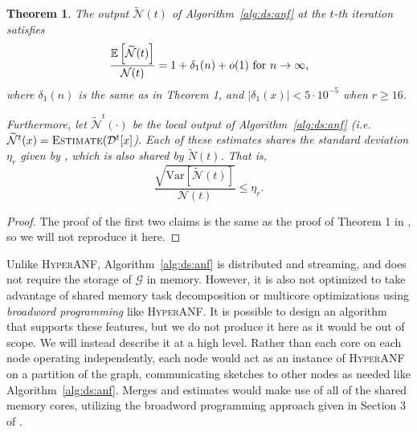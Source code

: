 \documentclass{report}
\newtheorem{theorem}{Theorem}[section]
\newcommand{\algoname}[1]{\textnormal{\textsc{#1}}}
\newcommand{\E}{\mathbb{E}}
\newcommand{\Var}{\mathrm{Var}}
\begin{document}
\begin{theorem}
The output $\widetilde{\mathcal{N}}(t)$ of Algorithm~\ref{alg:ds:anf} at the $t$-th iteration satisfies 
%
\begin{equation*}
	\frac{\E \left [ \widetilde{\mathcal{N}}(t) \right ]}{\mathcal{N}(t)} = 1 + \delta_1(n) + o(1) \textnormal{ for $n \rightarrow \infty$,}
\end{equation*}
%
where $\delta_1(n)$ is the same as in \cite{flajolet2007hyperloglog} Theorem 1, and $|\delta_1(x)| < 5 \cdot 10^{-5}$ when $r \geq 16$.

Furthermore, let $\widetilde{\mathcal{N}}^t(\cdot)$ be the local output of Algorithm~\ref{alg:ds:anf} (i.e. $\widetilde{\mathcal{N}}^t(x) = \algoname{Estimate}(\mathcal{D}^t[x]$).
Each of these estimates shares the standard deviation $\eta_r$ given by \cite{flajolet2007hyperloglog}, which is also shared by $\widetilde{N}(t)$. 
That is, 
%
\begin{equation*}
	\frac{\sqrt{\Var \left [ \widetilde{\mathcal{N}}(t)\right ]}}{\mathcal{N}(t)} \leq \eta_r.
\end{equation*}
%
\end{theorem}

\begin{proof}
The proof of the first two claims is the same as the proof of Theorem 1 in \cite{boldi2011hyperanf}, so we will not reproduce it here.
\end{proof}



Unlike \algoname{HyperANF}, Algorithm~\ref{alg:ds:anf} is distributed and streaming, and does not require the storage of $\mathcal{G}$ in memory. 
However, it is also not optimized to take advantage of shared memory task decomposition or multicore optimizations using \emph{broadword programming} like \algoname{HyperANF}.
It is possible to design an algorithm that supports these features, but we do not produce it here as it would be out of scope. 
We will instead describe it at a high level.
Rather than each core on each node operating independently, each node would act as an instance of \algoname{HyperANF} on a partition of the graph, communicating sketches to other nodes as needed like Algorithm~\ref{alg:ds:anf}.
Merges and estimates would make use of all of the shared memory cores, utilizing the broadword programming approach given in Section 3 of \cite{boldi2011hyperanf}.
\end{document}
